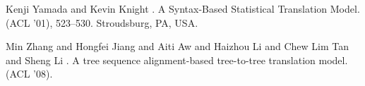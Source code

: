 \documentclass[a4,11pt]{article}
\begin{document}
\begin{thebibliography}{}
Kenji Yamada and Kevin Knight
.
\newblock A Syntax-Based Statistical Translation Model.
 (ACL '01), 523--530.
\newblock Stroudsburg, PA, USA.


Min Zhang and Hongfei Jiang and Aiti Aw and Haizhou Li and Chew Lim Tan and Sheng Li
.
\newblock A tree sequence alignment-based tree-to-tree translation model.
 (ACL '08).


\end{thebibliography}
\end{document}
